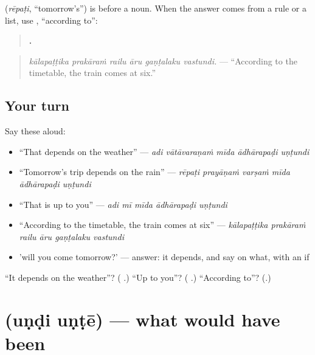 \textbf{} (\emph{rēpaṭi}, \textquotedblleft{}tomorrow's\textquotedblright{}) is \textbf{} before a noun. When the answer comes from a rule or a list, use \textbf{}, \textquotedblleft{}according to\textquotedblright{}:

\begin{quote}
\textbf{     .}
\end{quote}

\begin{quote}
\emph{kālapaṭṭika prakāraṁ railu āru gaṇṭalaku vastundi.} — \textquotedblleft{}According to the timetable, the train comes at six.\textquotedblright{}
\end{quote}

\subsection*{Your turn}
Say these aloud:

\begin{itemize}
\raggedright
  \item \textquotedblleft{}That depends on the weather\textquotedblright{} — \emph{adi vātāvaraṇaṁ mīda ādhārapaḍi uṇṭundi}
  \item \textquotedblleft{}Tomorrow's trip depends on the rain\textquotedblright{} — \emph{rēpaṭi prayāṇaṁ varṣaṁ mīda ādhārapaḍi uṇṭundi}
  \item \textquotedblleft{}That is up to you\textquotedblright{} — \emph{adi mī mīda ādhārapaḍi uṇṭundi}
  \item \textquotedblleft{}According to the timetable, the train comes at six\textquotedblright{} — \emph{kālapaṭṭika prakāraṁ railu āru gaṇṭalaku vastundi}
  \item 'will you come tomorrow?' — answer: it depends, and say on what, with an if
\end{itemize}

\begin{tcolorbox}[breakable,colback=teal!4,colframe=teal!35!black,title={Before you move on}]
\textquotedblleft{}It depends on the weather\textquotedblright{}? (\textbf{   }.) \textquotedblleft{}Up to you\textquotedblright{}? (\textbf{   }.) \textquotedblleft{}According to\textquotedblright{}? (\textbf{}.)
\end{tcolorbox}
\section[\texorpdfstring{\te{ఉండి} \te{ఉంటే} (uṇḍi uṇṭē)}{ఉండి ఉంటే (uṇḍi uṇṭē)}]{  (uṇḍi uṇṭē) — what would have been}

